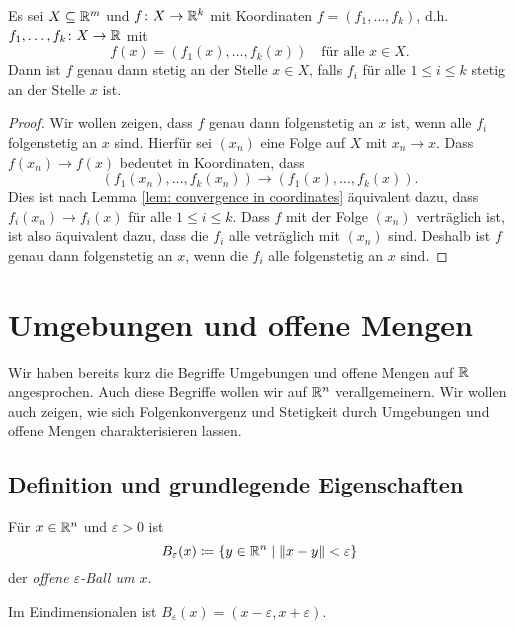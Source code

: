 \documentclass[a4paper,10pt]{article}
\begin{document}
\begin{lem}
 Es sei $X \subseteq \mathbb{R}^m$ und $f \colon X \to \mathbb{R}^k$ mit Koordinaten $f = (f_1, \dotsc, f_k)$, d.h. $f_1, \dotsc, f_k \colon X \to \mathbb{R}$ mit
 \[
  f(x) = (f_1(x), \dotsc, f_k(x)) \quad \text{für alle $x \in X$}.
 \]
 Dann ist $f$ genau dann stetig an der Stelle $x \in X$, falls $f_i$ für alle $1 \leq i \leq k$ stetig an der Stelle $x$ ist.
\end{lem}
\begin{proof}
 Wir wollen zeigen, dass $f$ genau dann folgenstetig an $x$ ist, wenn alle $f_i$ folgenstetig an $x$ sind. Hierfür sei $(x_n)$ eine Folge auf $X$ mit $x_n \to x$. Dass $f(x_n) \to f(x)$ bedeutet in Koordinaten, dass
 \[
  (f_1(x_n), \dotsc, f_k(x_n)) \to (f_1(x), \dots, f_k(x)).
 \]
 Dies ist nach Lemma \ref{lem: convergence in coordinates} äquivalent dazu, dass $f_i(x_n) \to f_i(x)$ für alle $1 \leq i \leq k$. Dass $f$ mit der Folge $(x_n)$ verträglich ist, ist also äquivalent dazu, dass die $f_i$ alle veträglich mit $(x_n)$ sind. Deshalb ist $f$ genau dann folgenstetig an $x$, wenn die $f_i$ alle folgenstetig an $x$ sind.
\end{proof}





\section{Umgebungen und offene Mengen}
Wir haben bereits kurz die Begriffe Umgebungen und offene Mengen auf $\mathbb{R}$ angesprochen. Auch diese Begriffe wollen wir auf $\mathbb{R}^n$ verallgemeinern. Wir wollen auch zeigen, wie sich Folgenkonvergenz und Stetigkeit durch Umgebungen und offene Mengen charakterisieren lassen.


\subsection{Definition und grundlegende Eigenschaften}


\begin{defi}
 Für $x \in \mathbb{R}^n$ und $\varepsilon > 0$ ist
 \[
  B_\varepsilon(x) \coloneqq \{y \in \mathbb{R}^n \mid \|x-y\| < \varepsilon\}
 \]
 der \emph{offene $\varepsilon$-Ball um $x$}.
\end{defi}


\begin{bem}
 Im Eindimensionalen ist $B_\varepsilon(x) = (x-\varepsilon,x+\varepsilon)$.
\end{bem}
\end{document}
